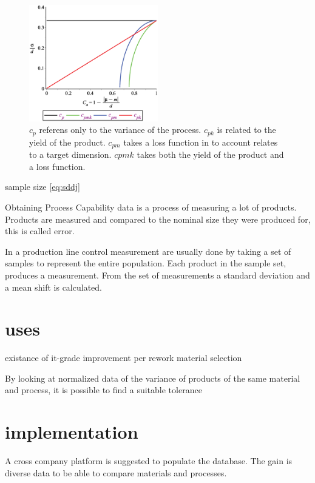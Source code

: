 \documentclass[aip,amsmath, reprint, author-year]{revtex4-1}
\begin{document}
\begin{figure}
\includegraphics[width=0.5\textwidth]{graph_postscript_test.eps}
\caption{\label{fig:cpk} $c_p$ referens only to the variance of the process. $c_{pk}$ is related to the yield of the product. $c_{pm}$ takes a loss function in to account relates to a target dimension. $cpmk$ takes both the yield of the product and a loss function. }
\end{figure}

sample size  \ref{eq:sddj}




Obtaining Process Capability data is a process of measuring a lot of products.
Products are measured and compared to the nominal size they were produced for, this is called error.

In a production line control measurement are usually done by taking a set of samples to represent the entire population. Each product in the sample set, produces a measurement. From the set of measurements a standard deviation and a mean shift is calculated.

\section{uses}
existance of it-grade
improvement per rework
material selection





By looking at normalized data of the variance of products of the same material and process, it is possible to find a suitable tolerance

\section{implementation}





A cross company platform is suggested to populate the database. The gain is diverse data to be able to compare materials and processes. 
\end{document}
